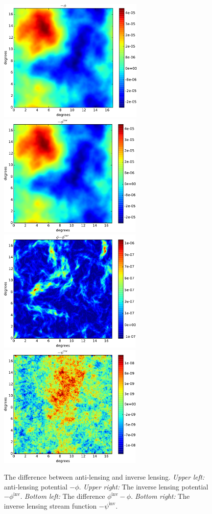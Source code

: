 \documentclass[iop,revtex4,apj,onecolumn]{emulateapj}
\begin{document}
\begin{figure}
\begin{center}
  \includegraphics[height=2.4in]{figure2a.pdf}\includegraphics[height=2.4in]{figure2b.pdf}\\%
  \includegraphics[height=2.4in]{figure2c.pdf}\includegraphics[height=2.4in]{figure2d.pdf}
\end{center}
\caption{\label{antilensing plots}
The difference between anti-lensing and inverse lensing. {\em Upper left:} anti-lensing potential $-\phi$. {\em Upper right:} The inverse lensing potential $-\phi^\text{inv}$. {\em Bottom left:} The difference $\phi^\text{inv}-\phi$. {\em Bottom right:} The inverse lensing stream function $-\psi^\text{inv}$.}
\end{figure}
\end{document}
